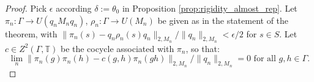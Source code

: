 \documentclass[11pt]{amsart}
\newcommand{\T}{{\mathbb{T}}}
\newcommand{\C}{{\mathbb{C}}}
\newcommand{\cN}{{\mathcal{N}}}
\theoremstyle{definition}
\theoremstyle{remark}
\theoremstyle{definition}
\begin{document}
    \begin{proof}
        Pick $\epsilon$ according $\delta := \theta_0$ in Proposition \ref{prop:rigidity_almost_rep}. 
        Let $\pi_n:\Gamma \to U(q_nM_nq_n)$, $\rho_n: \Gamma \to U(M_n)$ be given as in the statement of the theorem, with $\| \pi_n(s) - q_n\rho_n(s) q_n\|_{2,M_n} / \|q_n \|_{2,M_n}< \epsilon / 2$ for $s \in S$. Let $c\in Z^2(\Gamma, \T)$ be the cocycle associated with $\pi_n$, so that:
    $$\lim_n \| \pi_n(g)\pi_n(h) - c(g,h) \pi_n(gh)\|_{2,M_n} / \| q_n \|_{2,M_n} = 0 \text{ for all $g,h \in \Gamma$.}$$
    

\end{proof}
\end{document}
